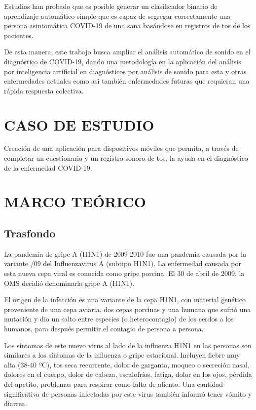\documentclass[journal]{IEEEtran}
\begin{document}
Estudios han probado que es posible generar un clasificador binario de aprendizaje automático simple que es capaz de segregar correctamente una persona asintomática COVID-19 de una sana basándose en registros de tos de los pacientes.

De esta manera, este trabajo busca ampliar el análisis automático de sonido en el diagnóstico de COVID-19, dando una metodología en la aplicación del análisis por inteligencia artificial en diagnósticos por análisis de sonido para esta y otras enfermedades actuales como así también enfermedades futuras que requieran una rápida respuesta colectiva.

\section{CASO DE ESTUDIO}
Creación de una aplicación para dispositivos móviles que permita, a través de completar un cuestionario y un registro sonoro de tos, la ayuda en el diagnóstico de la enfermedad COVID-19.

\section{MARCO TEÓRICO}
\subsection{Trasfondo}
La pandemia de gripe A (H1N1) de 2009-2010 fue una pandemia causada por la variante /09 del Influenzavirus A (subtipo H1N1). La enfermedad causada por esta nueva cepa viral es conocida como gripe porcina. El 30 de abril de 2009, la OMS decidió denominarla gripe A (H1N1).

El origen de la infección es una variante de la cepa H1N1, con material genético proveniente de una cepa aviaria, dos cepas porcinas y una humana que sufrió una mutación y dio un salto entre especies (o heterocontagio) de los cerdos a los humanos, para después permitir el contagio de persona a persona.

Los síntomas de este nuevo virus al lado de la influenza H1N1 en las personas son similares a los síntomas de la influenza o gripe estacional. Incluyen fiebre muy alta (38-40 ºC), tos seca recurrente, dolor de garganta, moqueo o secreción nasal, dolores en el cuerpo, dolor de cabeza, escalofríos, fatiga, dolor en los ojos, pérdida del apetito, problemas para respirar como falta de aliento. Una cantidad significativa de personas infectadas por este virus también informó tener vómito y diarrea.
\end{document}
